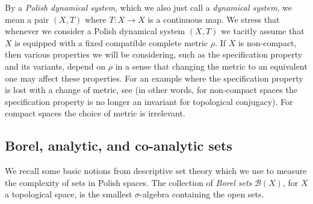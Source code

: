 \documentclass{amsart}
\theoremstyle{definition}
\newcommand{\sB}{\mathcal{B}}
\begin{document}
By a \emph{Polish dynamical system}, which we also just call a
\emph{dynamical system}, we mean a pair $(X,T)$ where
$T\colon X\to X$ is a continuous map.
We stress that whenever we consider a Polish dynamical system $(X,T)$ we tacitly assume that $X$ is equipped with a fixed  compatible complete metric $\rho$. If $X$ is non-compact, then various properties we will be considering, such as the specification property
and its variants, depend on $\rho$ in a sense that changing the metric to an equivalent one may affect these properties. For an example where the specification property is lost with a change of metric, see \cite[Proposition 7.1]{KU} (in other words, for non-compact spaces the specification property is no longer an invariant for topological conjugacy). For compact spaces the choice of metric is irrelevant.


\subsection{Borel, analytic, and co-analytic sets}
We recall some basic notions from descriptive set theory which we use
to measure  the complexity of sets in Polish spaces.
The collection of {\em Borel sets} $\sB(X)$, for $X$ a topological space, is
the smallest $\sigma$-algebra containing the open sets.
\end{document}

